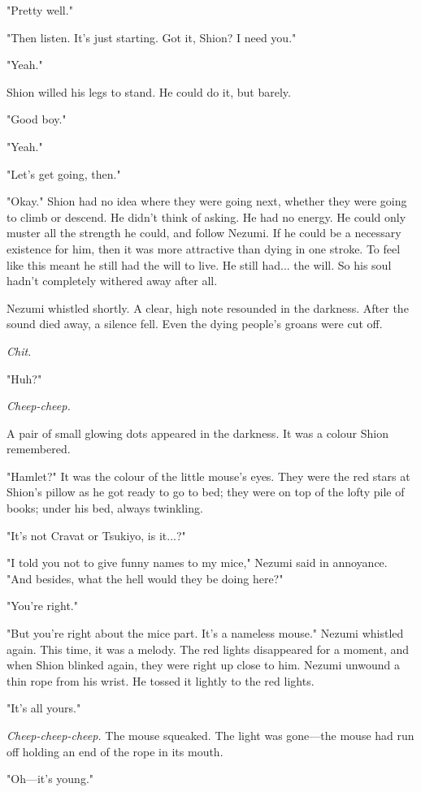 "Pretty well."

"Then listen. It's just starting. Got it, Shion? I need you."

"Yeah."

Shion willed his legs to stand. He could do it, but barely.

"Good boy."

"Yeah."

"Let's get going, then."

"Okay." Shion had no idea where they were going next, whether they were
going to climb or descend. He didn't think of asking. He had no energy.
He could only muster all the strength he could, and follow Nezumi. If he
could be a necessary existence for him, then it was more attractive than
dying in one stroke. To feel like this meant he still had the will to
live. He still had... the will. So his soul hadn't completely withered
away after all.

Nezumi whistled shortly. A clear, high note resounded in the darkness.
After the sound died away, a silence fell. Even the dying people's
groans were cut off.

\emph{Chit.}

"Huh?"

\emph{Cheep-cheep.}

A pair of small glowing dots appeared in the darkness. It was a colour
Shion remembered.

"Hamlet?" It was the colour of the little mouse's eyes. They were the
red stars at Shion's pillow as he got ready to go to bed; they were on
top of the lofty pile of books; under his bed, always twinkling.

"It's not Cravat or Tsukiyo, is it...?"

"I told you not to give funny names to my mice," Nezumi said in
annoyance. "And besides, what the hell would they be doing here?"

"You're right."

"But you're right about the mice part. It's a nameless mouse." Nezumi
whistled again. This time, it was a melody. The red lights disappeared
for a moment, and when Shion blinked again, they were right up close to
him. Nezumi unwound a thin rope from his wrist. He tossed it lightly to
the red lights.

"It's all yours."

\emph{Cheep-cheep-cheep.} The mouse squeaked. The light was gone---the mouse had
run off holding an end of the rope in its mouth.

"Oh---it's young."

